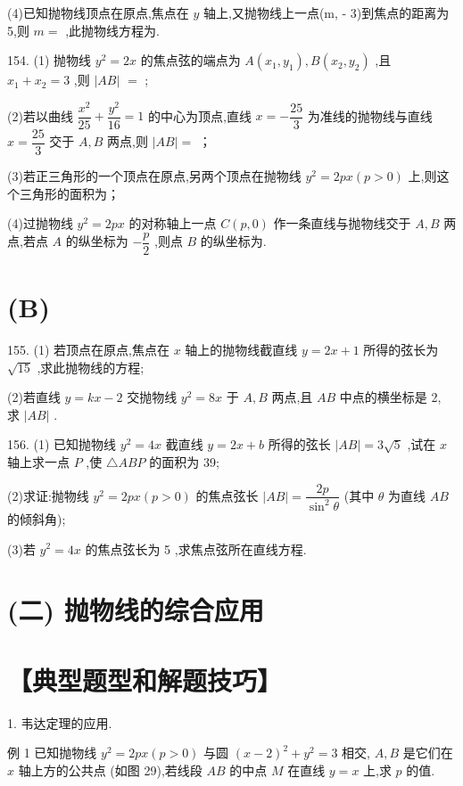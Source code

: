 (4)已知抛物线顶点在原点,焦点在 $y$ 轴上,又抛物线上一点(m, - 3)到焦点的距离为 5,则 $m =$ \blkda{},此抛物线方程为\blkda{}.

154. (1) 抛物线 ${y}^{2} = {2x}$ 的焦点弦的端点为 $A\left( {{x}_{1},{y}_{1}}\right) ,B\left( {{x}_{2},{y}_{2}}\right)$ ,且 ${x}_{1} + {x}_{2} = 3$ ,则 $\left| {AB}\right|$  $=$ \blkda{};

(2)若以曲线 $\dfrac{{x}^{2}}{25} + \dfrac{{y}^{2}}{16} = 1$ 的中心为顶点,直线 $x =  - \dfrac{25}{3}$ 为准线的抛物线与直线 $x = \dfrac{25}{3}$ 交于 $A,B$ 两点,则 $\left| {AB}\right|  =$ \blkda{}；

(3)若正三角形的一个顶点在原点,另两个顶点在抛物线 ${y}^{2} = {2px}\left( {p > 0}\right)$ 上,则这个三角形的面积为\blkda{}；

(4)过抛物线 ${y}^{2} = {2px}$ 的对称轴上一点 $C\left( {p,0}\right)$ 作一条直线与抛物线交于 $A,B$ 两点,若点 $A$ 的纵坐标为 $- \dfrac{p}{2}$ ,则点 $B$ 的纵坐标为\blkda{}.

\section*{(B)}

155. (1) 若顶点在原点,焦点在 $x$ 轴上的抛物线截直线 $y = {2x} + 1$ 所得的弦长为 $\sqrt{15}$ ,求此抛物线的方程;

(2)若直线 $y = {kx} - 2$ 交抛物线 ${y}^{2} = {8x}$ 于 $A,B$ 两点,且 ${AB}$ 中点的横坐标是 2, 求 $\left| {AB}\right|$ .

156. (1) 已知抛物线 ${y}^{2} = {4x}$ 截直线 $y = {2x} + b$ 所得的弦长 $\left| {AB}\right|  = 3\sqrt{5}$ ,试在 $x$ 轴上求一点 $P$ ,使 $\bigtriangleup {ABP}$ 的面积为 39;

(2)求证:抛物线 ${y}^{2} = {2px}\left( {p > 0}\right)$ 的焦点弦长 $\left| {AB}\right|  = \dfrac{2p}{{\sin }^{2}\theta }$ (其中 $\theta$ 为直线 ${AB}$ 的倾斜角);

(3)若 ${y}^{2} = {4x}$ 的焦点弦长为 5 ,求焦点弦所在直线方程.

\section*{(二) 抛物线的综合应用}

\section*{【典型题型和解题技巧】}

1. 韦达定理的应用.

例 1 已知抛物线 ${y}^{2} = {2px}\left( {p > 0}\right)$ 与圆 ${\left( x - 2\right) }^{2} + {y}^{2} = 3$ 相交, $A,B$ 是它们在 $x$ 轴上方的公共点 (如图 29),若线段 ${AB}$ 的中点 $M$ 在直线 $y = x$ 上,求 $p$ 的值.

